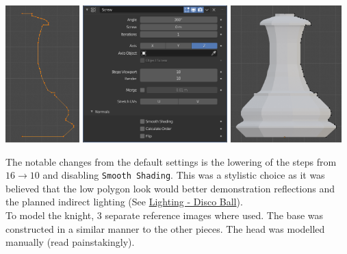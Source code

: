 \documentclass[11pt]{article}
\begin{document}
\begin{center}
\includegraphics[height=150pt]{Images/modelling piece inprogress.png}
\includegraphics[height=150pt]{Images/screw settings.png}
\includegraphics[height=150pt]{Images/pawn model.png}
\end{center}
The notable changes from the default settings is the lowering of the steps from
\(16 \to 10\) and disabling \texttt{Smooth Shading}. This was a stylistic choice as it
was believed that the low polygon look would better demonstration reflections and
the planned indirect lighting (See \hyperref[sec:org64438b9]{Lighting - Disco Ball}).\\

To model the knight, 3 separate reference images where used. The base was
constructed in a similar manner to the other pieces. The head was modelled
manually (read painstakingly).
\end{document}
